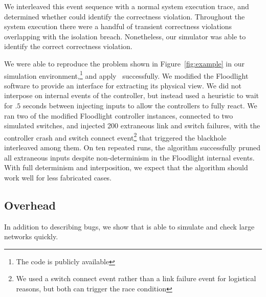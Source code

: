 {We interleaved this event sequence with a normal system execution trace, and
determined whether \projectname{} could identify the correctness violation.
Throughout the system execution there were a handful of transient
correctness violations overlapping with the isolation breach. Nonetheless, our
simulator was able to identify the correct correctness violation.

We were able to reproduce the problem shown in Figure~\ref{fig:example} in our
simulation environment,\footnote{The code is publicly available}
and apply \projectname~successfully.
We modified the Floodlight software to provide an interface for extracting its
physical view. We did not interpose on internal events of the controller, but instead used a
heuristic to wait for $.5$ seconds between injecting inputs to allow the
controllers to fully react. We ran two of the modified Floodlight controller
instances, connected to two simulated switches, and injected 200 extraneous link
and switch failures, with the controller crash and switch connect event\footnote{We used a switch connect
event rather than a link failure event for logistical reasons, but both
can trigger the race condition} that triggered the blackhole interleaved among them.
On ten repeated runs, the algorithm successfully pruned all extraneous
inputs despite non-determinism in the Floodlight internal events. With full determinism and
interposition, we expect that the algorithm should work well for less
fabricated cases.

\subsection{Overhead}


In addition to describing bugs, we show that \projectname{} is able
to simulate and check large networks quickly.

}
